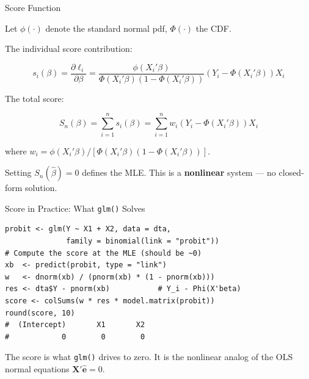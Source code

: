 \documentclass[aspectratio=169, handout, t]{beamer}
\numberwithin{equation}{section}
\begin{document}
\begin{frame}{Score Function}

Let $\phi(\cdot)$ denote the standard normal pdf, $\Phi(\cdot)$ the CDF.

\pause

The individual score contribution:

\[
s_i(\beta) = \frac{\partial \ell_i}{\partial \beta}
=
\frac{\phi(X_i'\beta)}{\Phi(X_i'\beta)(1-\Phi(X_i'\beta))}
\left(Y_i - \Phi(X_i'\beta)\right) X_i
\]

\pause

The total score:

\[
S_n(\beta) = \sum_{i=1}^n s_i(\beta) = \sum_{i=1}^n w_i \left(Y_i - \Phi(X_i'\beta)\right) X_i
\]

where $w_i = \phi(X_i'\beta)/[\Phi(X_i'\beta)(1-\Phi(X_i'\beta))]$.

\pause

\bigskip

Setting $S_n(\hat\beta) = 0$ defines the MLE. This is a \textbf{nonlinear} system --- no closed-form solution.

\end{frame}


\begin{frame}[fragile]{Score in Practice: What \texttt{glm()} Solves}
\small
\begin{lstlisting}
probit <- glm(Y ~ X1 + X2, data = dta,
              family = binomial(link = "probit"))
# Compute the score at the MLE (should be ~0)
xb  <- predict(probit, type = "link")
w   <- dnorm(xb) / (pnorm(xb) * (1 - pnorm(xb)))
res <- dta$Y - pnorm(xb)           # Y_i - Phi(X'beta)
score <- colSums(w * res * model.matrix(probit))
round(score, 10)
#  (Intercept)       X1       X2
#            0        0        0
\end{lstlisting}\pause
\vspace{-2pt}
\begin{tcolorbox}[colback=blue!5, colframe=blue!50, boxsep=2pt, top=2pt, bottom=2pt]
The score is what \texttt{glm()} drives to zero.  It is the nonlinear analog of the OLS normal equations $\bm{X'}\hat{\bm{e}}=0$.
\end{tcolorbox}

\end{frame}

\end{document}
